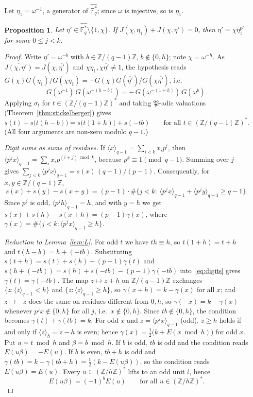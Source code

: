 \documentclass[11pt]{amsart}
\newtheorem{proposition}[theorem]{Proposition}
\theoremstyle{definition}
\theoremstyle{remark}
\numberwithin{equation}{section}
\newcommand{\Fs}{\mathbb{F}_q^{*}}
\newcommand{\Z}{\mathbb{Z}}
\newcommand{\res}[2]{\langle #1\rangle_{#2}}
\newcommand{\conj}[1]{\overline{#1}}
\begin{document}
Let $\eta_1=\omega^{-1}$, a generator of $\widehat{\Fs}$; since $\omega$ is injective, so is $\eta_1$.

\begin{proposition}\label{prop:coinc}
Let $\eta'\in\widehat{\Fs}\setminus\{1,\chi\}$. If $J(\chi,\eta_1)+\conj{J(\chi,\eta')}=0$, then $\eta'=\chi\eta_1^{p^j}$ for some
$0\le j<k$.
\end{proposition}

\begin{proof}
Write $\eta'=\omega^{-b}$ with $b\in\Z/(q-1)\Z$, $b\notin\{0,h\}$; note $\chi=\omega^{-h}$. As $\conj{J(\chi,\eta')}=J(\chi,\conj{\eta'})$
and $\chi\eta_1,\chi\conj{\eta'}\ne1$, the hypothesis reads $G(\chi)G(\eta_1)/G(\chi\eta_1)=-G(\chi)G(\conj{\eta'})/G(\chi\conj{\eta'})$,
i.e.\
\[
G(\omega^{-1})\,G(\omega^{-(h-b)})=-\,G(\omega^{-(1+h)})\,G(\omega^{b}).
\]
Applying $\sigma_t$ for $t\in(\Z/(q-1)\Z)^*$ and taking $\mathfrak P$-adic valuations (Theorem~\ref{thm:stickelberger}) gives
\begin{equation}\label{eq:digits}
s(t)+s\bigl(t(h-b)\bigr)=s\bigl(t(1+h)\bigr)+s(-tb)\qquad\text{for all }t\in(\Z/(q-1)\Z)^* .
\end{equation}
(All four arguments are non-zero modulo $q-1$.)

\emph{Digit sums as sums of residues.} If $\res{x}{q-1}=\sum_{i<k}x_ip^i$, then $\res{p^jx}{q-1}=\sum_ix_ip^{(i+j)\bmod k}$, because
$p^k\equiv1\pmod{q-1}$. Summing over $j$ gives $\sum_{j<k}\res{p^jx}{q-1}=s(x)\,(q-1)/(p-1)$. Consequently, for $x,y\in\Z/(q-1)\Z$,
\[
s(x)+s(y)-s(x+y)=(p-1)\cdot\#\bigl\{j<k:\ \res{p^jx}{q-1}+\res{p^jy}{q-1}\ge q-1\bigr\}.
\]
Since $p^j$ is odd, $\res{p^jh}{q-1}=h$, and with $y=h$ we get $s(x)+s(h)-s(x+h)=(p-1)\gamma(x)$, where
$\gamma(x)=\#\{j<k:\res{p^jx}{q-1}\ge h\}$.

\emph{Reduction to Lemma~\ref{lem:L}.} For odd $t$ we have $th\equiv h$, so $t(1+h)=t+h$ and $t(h-b)=h+(-tb)$. Substituting
$s(t+h)=s(t)+s(h)-(p-1)\gamma(t)$ and $s(h+(-tb))=s(h)+s(-tb)-(p-1)\gamma(-tb)$ into~\eqref{eq:digits} gives
$\gamma(t)=\gamma(-tb)$. The map $z\mapsto z+h$ on $\Z/(q-1)\Z$ exchanges $\{z:\res{z}{q-1}<h\}$ and $\{z:\res{z}{q-1}\ge h\}$, so
$\gamma(x+h)=k-\gamma(x)$ for all $x$; and $z\mapsto-z$ does the same on residues different from $0,h$, so $\gamma(-x)=k-\gamma(x)$
whenever $p^jx\notin\{0,h\}$ for all $j$, i.e.\ $x\notin\{0,h\}$. Since $tb\notin\{0,h\}$, the condition becomes
$\gamma(t)+\gamma(tb)=k$. For odd $x$ and $z=\res{p^jx}{q-1}$ (odd), $z\ge h$ holds if and only if $\res{z}{h}=z-h$ is even; hence
$\gamma(x)=\tfrac12\bigl(k+E(x\bmod h)\bigr)$ for odd $x$. Put $u=t\bmod h$ and $\beta=b\bmod h$. If $b$ is odd, $tb$ is odd and the
condition reads $E(u\beta)=-E(u)$. If $b$ is even, $tb+h$ is odd and $\gamma(tb)=k-\gamma(tb+h)=\tfrac12(k-E(u\beta))$, so the condition
reads $E(u\beta)=E(u)$. Every $u\in(\Z/h\Z)^*$ lifts to an odd unit $t$, hence
\[
E(u\beta)=(-1)^bE(u)\qquad\text{for all }u\in(\Z/h\Z)^* .
\]


\end{proof}
\end{document}
